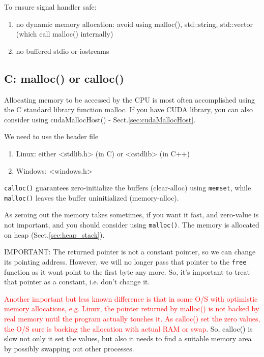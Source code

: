 To ensure signal handler safe:
\begin{enumerate}
  \item no dynamic memory allocation: avoid using malloc(), std::string,
  std::vector (which call malloc() internally)  
  
  \item  no buffered stdio or iostreams
\end{enumerate}

\subsection{C: malloc() or calloc()}
\label{sec:malloc()}
\label{sec:calloc()}

Allocating memory to be accessed by the CPU is most often accomplished using the
C standard library function malloc. If you have CUDA library, you can also
consider using cudaMallocHost() - Sect.\ref{sec:cudaMallocHost}.
 
We need to use the header file
\begin{enumerate}
  \item Linux: either  <stdlib.h> (in C) or <cstdlib> (in C++)
  \item Windows: <windows.h>
\end{enumerate}

\verb!calloc()! guarantees zero-initialize the buffers (clear-alloc) using
\verb!memset!, while \verb!malloc()! leaves the buffer uninitialized
(memory-alloc). 

As zeroing out the memory takes sometimes, if you want it fast, and zero-value
is not important, and you should consider using \verb!malloc()!.
The memory is allocated on heap (Sect.\ref{sec:heap_stack}).

IMPORTANT: The returned pointer is not a constant pointer, so we can change its
pointing address. However, we will no longer pass that pointer to the
\verb!free! function as it wont point to the first byte any more. So, it's
important to treat that pointer as a constant, i.e. don't change it.

\textcolor{red}{Another important but less known difference is that in some O/S
with optimistic memory allocations, e.g. Linux, the pointer returned by malloc()
is not backed by real memory until the program actually touches it. As calloc()
set the zero values, the O/S sure is backing the allocation with actual RAM or
swap}. So, calloc() is slow not only it set the values, but also it needs to
find a suitable memory area by possibly swapping out other processes.

